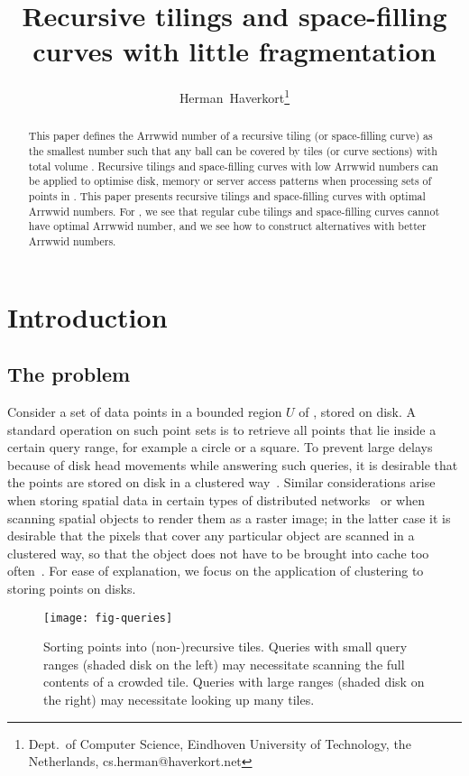 \documentclass[11pt,a4paper]{article}
\newcommand{\unittile}{\ensuremath{U}\xspace}
\begin{document}
\title{Recursive tilings and space-filling curves with little fragmentation}

\author{Herman~Haverkort\thanks{Dept.\ of Computer Science, Eindhoven University of Technology, the Netherlands, cs.herman@haverkort.net}
}
\maketitle

\begin{abstract}
This paper defines the Arrwwid number of a recursive tiling (or space-filling curve) as the smallest number  such that any ball  can be covered by  tiles (or curve sections) with total volume . Recursive tilings and space-filling curves with low Arrwwid numbers can be applied to optimise disk, memory or server access patterns when processing sets of points in . This paper presents recursive tilings and space-filling curves with optimal Arrwwid numbers. For , we see that regular cube tilings and space-filling curves cannot have optimal Arrwwid number, and we see how to construct alternatives with better Arrwwid numbers.
\end{abstract}

\section{Introduction}
\subsection{The problem}
Consider a set of data points in a bounded region \unittile of , stored on disk. A standard operation on such point sets is to retrieve all points that lie inside a certain query range, for example a circle or a square. To prevent large delays because of disk head movements while answering such queries, it is desirable that the points are stored on disk in a clustered way~\cite{Asano1997,Jagadish1990,Jagadish1997,Kumar1994,Moon2001}. Similar considerations arise when storing spatial data in certain types of distributed networks~\cite{Scholl2009} or when scanning spatial objects to render them as a raster image; in the latter case it is desirable that the pixels that cover any particular object are scanned in a clustered way, so that the object does not have to be brought into cache too often~\cite{Voorhies1991}. For ease of explanation, we focus on the application of clustering to storing points on disks.

\begin{figure}
\centering
\texttt{[image: fig-queries]}
\caption{Sorting points into (non-)recursive tiles. Queries with small query ranges (shaded disk on the left) may necessitate scanning the full contents of a crowded tile. Queries with large ranges (shaded disk on the right) may necessitate looking up many tiles.}
\label{fig:queries}
\end{figure}
\end{document}
